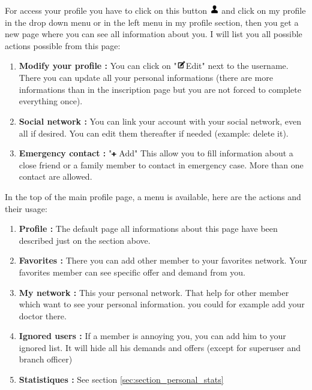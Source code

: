 \documentclass[11pt, a4paper]{article}   	%
\begin{document}
For access your profile you have to click on this button \includegraphics[width=0.4cm]{user_icon.png} and click on my profile in the drop down menu or in the left menu in my profile section, then you get a new page where you can see all information about you. I will list you all possible actions possible from this page:
\begin{enumerate}
  \item \textbf{Modify your profile :} You can click on "\includegraphics[width=0.4cm]{edit_icon.png}Edit" next to the username. There you can update all your personal informations (there are more informations than in the inscription page but you are not forced to complete everything once).
  \item \textbf{Social network :} You can link your account with your social network, even all if desired. You can edit them thereafter if needed (example: delete it).
  \item \textbf{Emergency contact :} "\includegraphics[width=0.2cm]{plus_icon.png} Add" This allow you to fill information about a close friend or a family member to contact in emergency case. More than one contact are allowed.  
\end{enumerate}
In the top of the main profile page, a menu is available, here are the actions and their usage:
\begin{enumerate}
  \item \textbf{Profile :} The default page all informations about this page have been described just on the section above.
  \item \textbf{Favorites :} There you can add other member to your favorites network. Your favorites member can see specific offer and demand from you.
  \item \textbf{My network :} This your personal network. That help for other member which want to see your personal information. you could for example add your doctor there.
  \item \textbf{Ignored users :} If a member is annoying you, you can add him to your ignored list. It will hide all his demands and offers (except for superuser and branch officer)
  \item \textbf{Statistiques :} See section \ref{sec:section_personal_stats}
\end{enumerate}
\end{document}
